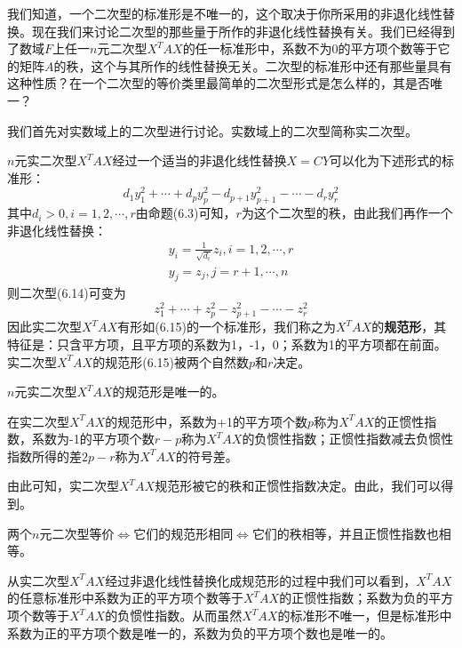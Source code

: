 \documentclass[lang=cn,10pt]{elegantbook}
\begin{document}
我们知道，一个二次型的标准形是不唯一的，这个取决于你所采用的非退化线性替换。现在我们来讨论二次型的那些量于所作的非退化线性替换有关。我们已经得到了数域$F$上任一$n$元二次型$X^{T}AX$的任一标准形中，系数不为0的平方项个数等于它的矩阵$A$的秩，这个与其所作的线性替换无关。二次型的标准形中还有那些量具有这种性质？在一个二次型的等价类里最简单的二次型形式是怎么样的，其是否唯一？

我们首先对实数域上的二次型进行讨论。实数域上的二次型简称实二次型。

$n$元实二次型$X^{T}AX$经过一个适当的非退化线性替换$X=CY$可以化为下述形式的标准形：
\begin{equation}
	d_{1}y^{2}_{1}+\cdots+d_{p}y^{2}_{p}-d_{p+1}y^{2}_{p+1}-\cdots-d_{r}y^{2}_{r}
\end{equation}
其中$d_{i}>0,i=1,2,\cdots,r$由命题(6.3)可知，$r$为这个二次型的秩，由此我们再作一个非退化线性替换：
\begin{equation*}
	\begin{split}
		y_{i}=\frac{1}{\sqrt{d_{i}}}z_{i},i=1,2,\cdots,r
		\\
		y_{j}=z_{j},j=r+1,\cdots,n
	\end{split}
\end{equation*}
则二次型(6.14)可变为
\begin{equation}
	z^{2}_{1}+\cdots+z^{2}_{p}-z^{2}_{p+1}-\cdots-z^{2}_{r}
\end{equation}
因此实二次型$X^{T}AX$有形如(6.15)的一个标准形，我们称之为$X^{T}AX$的\textbf{规范形}，其特征是：只含平方项，且平方项的系数为1，-1，0；系数为1的平方项都在前面。实二次型$X^{T}AX$的规范形(6.15)被两个自然数$p$和$r$决定。
\begin{theorem}[惯性定理]
	$n$元实二次型$X^{T}AX$的规范形是唯一的。
\end{theorem}
\begin{definition}
	在实二次型$X^{T}AX$的规范形中，系数为+1的平方项个数$p$称为$X^{T}AX$的正惯性指数，系数为-1的平方项个数$r-p$称为$X^{T}AX$的负惯性指数；正惯性指数减去负惯性指数所得的差$2p-r$称为$X^{T}AX$的符号差。
\end{definition}
由此可知，实二次型$X^{T}AX$规范形被它的秩和正惯性指数决定。由此，我们可以得到。
\begin{proposition}
	两个$n$元二次型等价$\Longleftrightarrow $它们的规范形相同$\Longleftrightarrow $它们的秩相等，并且正惯性指数也相等。
\end{proposition}

从实二次型$X^{T}AX$经过非退化线性替换化成规范形的过程中我们可以看到，$X^{T}AX$的任意标准形中系数为正的平方项个数等于$X^{T}AX$的正惯性指数；系数为负的平方项个数等于$X^{T}AX$的负惯性指数。从而虽然$X^{T}AX$的标准形不唯一，但是标准形中系数为正的平方项个数是唯一的，系数为负的平方项个数也是唯一的。
\end{document}
